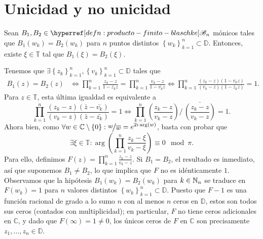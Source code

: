 \section{Unicidad y no unicidad}

\begin{lem}\label{lem:prod-finitos-blaschke-igualdad-n-puntos}
    Sean $B_1, B_2 \in \exhyperref[defn:producto-finito-blaschke]{producto-finito-blaschke}{\mathscr{B}_n}$ mónicos tales que $B_1(w_k) = B_2(w_k)$ para $n$ puntos distintos $\left\{w_k\right\}_{k=1}^n \subset \mathbb{D}$. Entonces, existe $\xi \in \mathbb{T}$ tal que $B_1(\xi) = B_2(\xi)$.
\end{lem}
\begin{dem}
    Tenemos que $\exists \left\{z_k\right\}_{k=1}^n, \left\{v_k\right\}_{k=1}^n \subset \mathbb{D}$ tales que
    \[
    \begin{aligned}
        B_1(z) = B_2(z) &\iff \prod_{k=1}^n \frac{z_k - z}{1 - \overline{z_k} z} = \prod_{k=1}^n \frac{v_k - z}{1 - \overline{v_k} z} 
        \iff \prod_{k=1}^n \frac{(z_k - z)(1 - \overline{v_k} z)}{(v_k - z)(1 - \overline{z_k} z)} = 1.
    \end{aligned}
    \]
    Para $z \in \mathbb{T}$, esta última igualdad es equivalente a
    \[
    \prod_{k=1}^n \frac{(z_k - z)(\bar{z} - \bar{v_k})}{(v_k - z)(\bar{z} - \bar{z_k})} = 1 \iff \prod_{k=1}^n \left(\frac{z_k - z}{v_k - z}\right) \bigg/\, \bar{\left(\frac{z_k - z}{v_k - z}\right)} = 1.
    \]
    Ahora bien, como $\forall w \in \mathbb{C} \setminus \left\{0\right\} : \ds \sfrac{w}{\bar{w}} = e^{2i \arg(w)}$, basta con probar que
    \[
    \exists \xi \in \mathbb{T} : \arg \left(\prod_{k=1}^n \frac{z_k - \xi}{v_k - \xi}\right) \equiv 0 \mod \pi. 
    \]
    Para ello, definimos $F(z) = \prod_{k=1}^n \frac{z_k - z}{v_k - z}$. Si $B_1 = B_2$, el resultado es inmediato, así que suponemos $B_1 \neq B_2$, lo que implica que $F$ no es idénticamente $1$. Observamos que la hipótesis $B_1(w_k) = B_2(w_k)$ para $k \in \mathbb{N}_n$ se traduce en $F(w_k) = 1$ para $n$ valores distintos $\left\{w_k\right\}_{k=1}^n \subset \mathbb{D}$. Puesto que $F - 1$ es una función racional de grado a lo sumo $n$ con al menos $n$ ceros en $\mathbb{D}$, estos son todos sus ceros (contados con multiplicidad); en particular, $F$ no tiene ceros adicionales en $\mathbb{C}$, y dado que $F(\infty) = 1 \neq 0$, los únicos ceros de $F$ en $\mathbb{C}$ son precisamente $z_1, \ldots, z_n \in \mathbb{D}$.


\end{dem}
